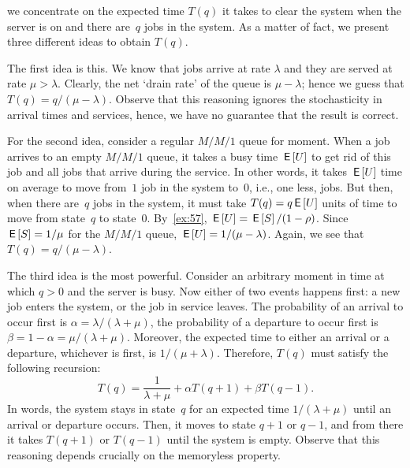 \documentclass[queueing-book.tex]{subfiles}
\begin{document}
 we concentrate on the expected time $T(q)$ it takes to clear the system when  the server is on and there are~$q$ jobs in the system.
As a matter of fact, we present three different ideas to obtain $T(q)$.

The first idea is this. We know that jobs arrive at rate $\lambda$ and they are served at rate $\mu>\lambda$.
Clearly, the net `drain rate' of the queue is $\mu-\lambda$; hence we guess that $T(q)=q/(\mu-\lambda)$.
Observe that this reasoning ignores the stochasticity in arrival times and services, hence, we have no guarantee that the result is correct.


For the second idea, consider a regular $M/M/1$ queue for moment.
When a job arrives to an empty $M/M/1$ queue, it takes a busy time $\,\mathsf{E}\left[U\right]$ to get rid of this job and all jobs that arrive during the service.
In other words, it takes $\,\mathsf{E}\left[U\right]$ time on average to move from~$1$ job in the system to~$0$, i.e., one less, jobs.
But then, when there are~$q$ jobs in the system, it must take $T(q) = q\,\mathsf{E}\left[U\right]$ units of time to move from state~$q$ to state~$0$.
By~\cref{ex:57}, $\,\mathsf{E}\left[U\right]=\,\mathsf{E}\left[S\right]/(1-\rho)$. Since $\,\mathsf{E}\left[S\right] = 1/\mu$ for the $M/M/1$ queue,  $\,\mathsf{E}\left[U\right] = 1/(\mu-\lambda)$.
Again, we see that $T(q)=q/(\mu-\lambda)$.

The third idea is the most powerful.
Consider an arbitrary moment in time at which $q>0$ and the server is busy.
Now either of two events happens first: a new job enters the system, or the job in service leaves.
The probability of an arrival to occur first is $\alpha=\lambda/(\lambda+\mu)$, the probability of a departure to occur first is $\beta=1-\alpha = \mu/(\lambda+\mu)$.
Moreover, the expected time to either an arrival or a departure, whichever is first, is $1/(\mu+\lambda)$. Therefore, $T(q)$ must satisfy the following recursion:
\begin{equation}  \label{eq:92}
  T(q) =  \frac{1}{\lambda+\mu} + \alpha T(q+1) + \beta T(q-1).
\end{equation}
In words, the system stays in state~$q$ for an expected time $1/(\lambda+\mu)$ until an arrival or departure occurs.
Then, it moves to state $q+1$ or $q-1$, and from there it takes $T(q+1)$ or $T(q-1)$ until the system is empty.
Observe that this reasoning depends crucially on the memoryless property.
\end{document}
